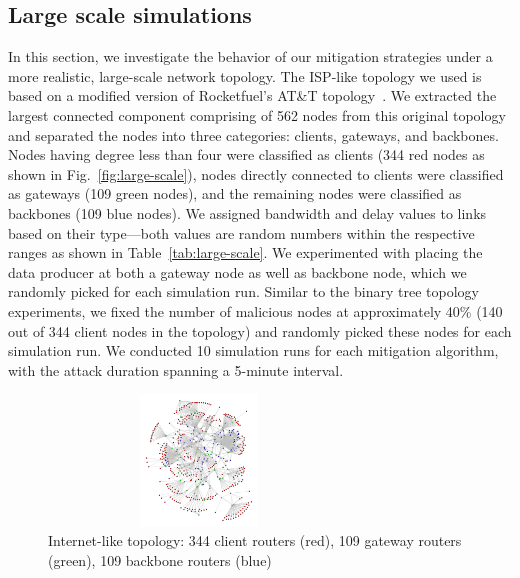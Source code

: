 \documentclass[10pt,conference]{IEEEtran}
\begin{document}
{%

\subsection{Large scale simulations}
\label{sec:largescale}


In this section, we investigate the behavior of our mitigation strategies under a more realistic, large-scale network topology. The ISP-like topology we used is based on a modified version of Rocketfuel's AT\&T topology~\cite{rocketfuel}.
We extracted the largest connected component comprising of 562 nodes from this original topology and separated the nodes into three categories: clients, gateways, and backbones. Nodes having degree less than four were classified as clients (344 red nodes as shown in Fig.~\ref{fig:large-scale}), nodes directly connected to clients were classified as gateways (109 green nodes), and the remaining nodes were classified as backbones (109 blue nodes). 
We assigned bandwidth and delay values to links based on their type---both values are random numbers within the respective ranges as shown in Table~\ref{tab:large-scale}. We experimented with placing the data producer at both a gateway node as well as backbone node, which we randomly picked for each simulation run. Similar to the binary tree topology experiments, we fixed the number of malicious nodes at approximately 40\% (140 out of 344 client nodes in the topology) and randomly picked these nodes for each simulation run. We conducted 10 simulation runs for each mitigation algorithm, with the attack duration spanning a 5-minute interval.

\begin{figure}[t]
  \centering
  \includegraphics[scale=0.15,angle=90,height=3.5cm,width=8cm]{7018-r0}
  \caption{Internet-like topology: 344 client routers (red), 109 gateway routers (green), 109 backbone routers (blue)}
  \label{fig:large-scale-topo}
\end{figure}

}
\end{document}
